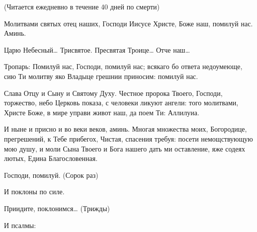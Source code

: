 \mychapterending


\begin{mymulticols}
 


(Читается ежедневно в течение 40 дней по смерти) 

Молитвами святых отец наших, Господи Иисусе Христе, Боже наш, помилуй нас. Аминь. 

Царю Небесный… Трисвятое. Пресвятая Троице… Отче наш… 

Тропарь: Помилуй нас, Господи, помилуй нас; всякаго бо ответа недоумеюще, сию Ти молитву яко Владыце грешнии приносим: помилуй нас. 

Слава Отцу и Сыну и Святому Духу. Честное пророка Твоего, Господи, торжество, небо Церковь показа, с человеки ликуют ангели: того молитвами, Христе Боже, в мире управи живот наш, да поем Ти: Аллилуиа. 

И ныне и присно и во веки веков, аминь. Многая множества моих, Богородице, прегрешений, к Тебе прибегох, Чистая, спасения требуя: посети немощствующую мою душу, и моли Сына Твоего и Бога нашего дать ми оставление, яже содеях лютых, Едина Благословенная. 

Господи, помилуй. (Сорок раз) 

И поклоны по силе. 

Приидите, поклонимся… (Трижды) 

И псалмы:





\end{mymulticols}
